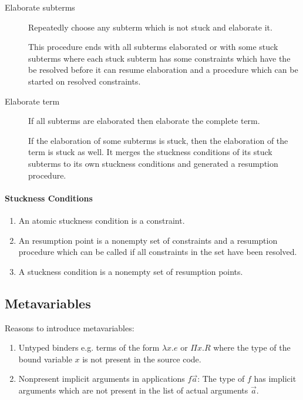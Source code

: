 \begin{description}
\item [Elaborate subterms]

    Repeatedly choose any subterm which is not stuck and elaborate it.

    This procedure ends with all subterms elaborated or with some stuck subterms
    where each stuck subterm has some constraints which have the be resolved
    before it can resume elaboration and a procedure which can be started on
    resolved constraints.

\item [Elaborate term]
    If all subterms are elaborated then elaborate the complete term.

    If the elaboration of some subterms is stuck, then the elaboration of the
    term is stuck as well. It merges the stuckness conditions of its stuck
    subterms to its own stuckness conditions and generated a resumption
    procedure.
\end{description}



\paragraph{Stuckness Conditions}

\begin{enumerate}
    \item
        An atomic stuckness condition is a constraint.

    \item An resumption point is a nonempty set of constraints and a
        resumption procedure which can be called if all constraints in the set
        have been resolved.

    \item A stuckness condition is a nonempty set of resumption points.
\end{enumerate}






\subsection{Metavariables}

Reasons to introduce metavariables:
\begin{enumerate}

    \item Untyped binders e.g. terms of the form $\lambda x. e$ or $\Pi x. R$
        where the type of the bound variable $x$ is not present in the source
        code.

    \item Nonpresent implicit arguments in applications $f \vec a$: The type of
        $f$ has implicit arguments which are not present in the list of actual
        arguments $\vec a$.
\end{enumerate}




